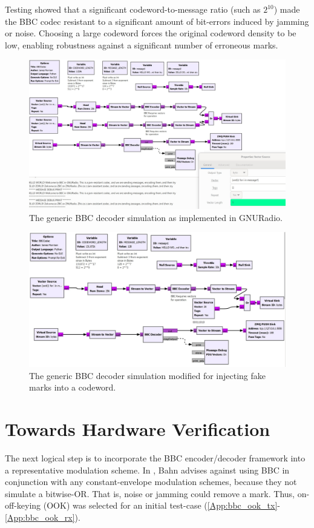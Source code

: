 \documentclass[conference]{IEEEtran}
\begin{document}
{Testing showed that a significant codeword-to-message ratio (such as $2^{10}$) made the BBC codec resistant to a significant amount of bit-errors induced by jamming or noise. Choosing a large codeword forces the original codeword density to be low, enabling robustness against a significant number of erroneous marks.


\begin{figure}[h]
    \centering
    \includegraphics[scale=0.25]{./figures/GRCCodec_Multiple Messages_V2}
    \caption{The generic BBC decoder simulation as implemented in GNURadio. }
    \label{fig:bbc_sim}
\end{figure}

\begin{figure}[h]
    \centering
    \includegraphics[scale=0.25]{./figures/GRCCodec_Fake marks}
    \caption{The generic BBC decoder simulation modified for injecting fake marks into a codeword.}
    \label{fig:bbc_fake_news}
\end{figure}

\section{Towards Hardware Verification}
The next logical step is to incorporate the BBC encoder/decoder framework into a representative modulation scheme. In \cite{thesis}, Bahn advises against using BBC in conjunction with any constant-envelope modulation schemes, because they not simulate a bitwise-OR. That is, noise or jamming could remove a mark. Thus, on-off-keying (OOK) was selected for an initial test-case (\ref{App:bbc_ook_tx}-\ref{App:bbc_ook_rx}). 

}
\end{document}
